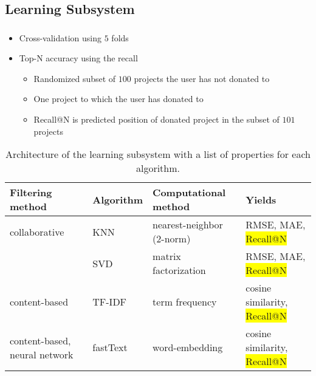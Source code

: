 \documentclass[aspectratio=169]{beamer}
\begin{document}
\subsection{Learning Subsystem}
\begin{frame}
	\frametitle{\insertsection}
	\framesubtitle{\insertsubsection}

	\begin{itemize}
		\item Cross-validation using $5$ folds
		\item Top-N accuracy using the recall~\autocite{Cremonesi:2010:PRA:1864708.1864721}
		\begin{itemize}
			\item Randomized subset of $100$ projects the user has not donated to
			\item One project to which the user has donated to
			\item Recall@N is predicted position of donated project in the subset of $101$ projects
		\end{itemize}
	\end{itemize}

	\begin{table}
		\scriptsize
		\centering
		\begin{tabular}{l|lll}
			Filtering method & Algorithm & Computational method & Yields \\
			\hline
			\hline
			collaborative & KNN & nearest-neighbor (2-norm) & RMSE, MAE, \colorbox{yellow}{Recall@N} \\
			& SVD & matrix factorization & RMSE, MAE, \colorbox{yellow}{Recall@N} \\
			\hline
			content-based & TF-IDF & term frequency & cosine similarity, \colorbox{yellow}{Recall@N} \\
			\hline
			content-based, neural network & fastText & word-embedding & cosine similarity, \colorbox{yellow}{Recall@N} \\
		\end{tabular}
		\caption{Architecture of the learning subsystem with a list of properties for each algorithm.}
	\end{table}

\end{frame}
\end{document}
